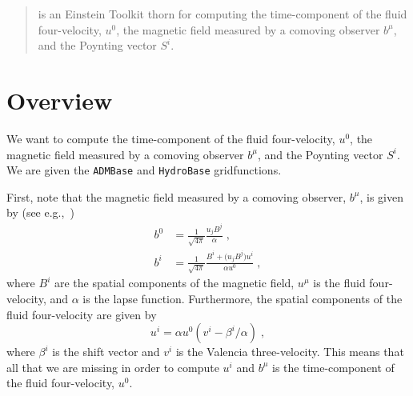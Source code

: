 \linespread{1.0}

\newenvironment{packed_itemize}{
\begin{itemize}
  \setlength{\itemsep}{0.0pt}
  \setlength{\parskip}{0.0pt}
  \setlength{\parsep}{ 0.0pt}
}{\end{itemize}}

\newenvironment{packed_enumerate}{
\begin{enumerate}
  \setlength{\itemsep}{0.0pt}
  \setlength{\parskip}{0.0pt}
  \setlength{\parsep}{ 0.0pt}
}{\end{enumerate}}

\begin{abstract}
  \thornname is an Einstein Toolkit thorn for computing the
  time-component of the fluid four-velocity, $u^0$, the magnetic field
  measured by a comoving observer $b^{\mu}$, and the Poynting vector
  $S^i$.
\end{abstract}


\section{Overview}
\label{sec:overview}

We want to compute the time-component of the fluid four-velocity, $u^0$,
the magnetic field measured by a comoving observer $b^{\mu}$, and the
Poynting vector $S^i$. We are given the \texttt{ADMBase} and
\texttt{HydroBase} gridfunctions.

First, note that the magnetic field measured by a comoving observer,
$b^{\mu}$, is given by (see e.g.,~\cite{duez2005relativistic})
\begin{align}
  b^{0} &= \frac{1}{\sqrt{4\pi}}\frac{u_{j}B^{j}}{\alpha}\;,\\
  b^{i} &= \frac{1}{\sqrt{4\pi}}\frac{B^{i} + \bigl(u_{j}B^{j}\bigr)u^{i}}{\alpha u^{0}}\;,
\end{align}
where $B^{i}$ are the spatial components of the magnetic field,
$u^{\mu}$ is the fluid four-velocity, and $\alpha$ is the lapse
function. Furthermore, the spatial components of the fluid four-velocity
are given by
\begin{equation}
  u^{i} = \alpha u^{0}\left(v^{i}-\beta^{i}/\alpha\right)\;,
\end{equation}
where $\beta^{i}$ is the shift vector and $v^{i}$ is the Valencia
three-velocity. This means that all that we are missing in order to
compute $u^{i}$ and $b^{\mu}$ is the time-component of the fluid
four-velocity, $u^{0}$.

